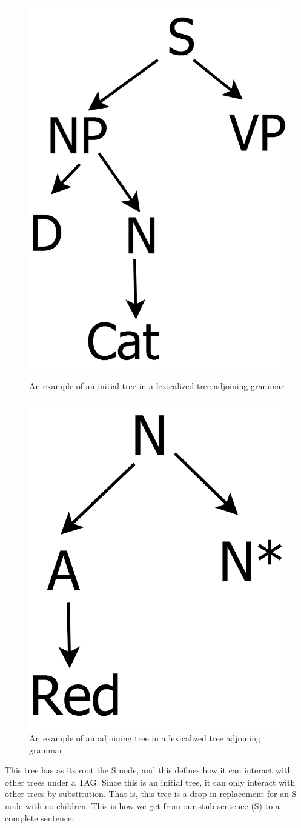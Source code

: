 \begin{figure}[ht]
\centering
\begin{minipage}[b]{0.45\linewidth}
\centering
\includegraphics[width=0.5\linewidth]{initial-example.png}
\caption{An example of an initial tree in a lexicalized tree adjoining grammar}
\label{initial-tree-example}
\end{minipage}
\quad
\begin{minipage}[b]{0.45\linewidth}
\centering
\includegraphics[width=0.5\linewidth]{adjoining-tree-example.png}
\caption{An example of an adjoining tree in a lexicalized tree adjoining grammar}
\label{adjoining-tree-example}
\end{minipage}
\end{figure}

This tree has as its root the S node, and this defines how it can interact with other
trees under a TAG.  Since this is an initial tree, it can only interact with other trees by
substitution.  That is, this tree is a drop-in replacement for an S node with no children.
This is how we get from our stub sentence (S) to a complete sentence.

